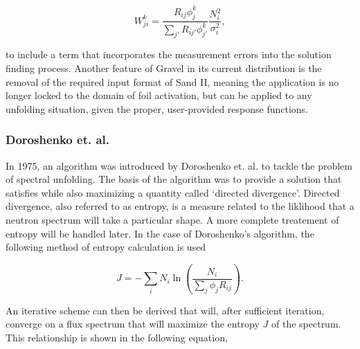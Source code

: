 \begin{equation}\label{eqn:gravel-w}
W_{ji}^k = \frac{R_{ij} \phi_{j}^k}{\sum_{j'} R_{ij'} \phi_{j'}^k} \frac{N_i^2}{\sigma_i^2} ,
\end{equation}

to include a term that incorporates the measurement errors into the solution finding process.
Another feature of Gravel in its current distribution is the removal of the required input format of Sand II, meaning the application is no longer locked to the domain of foil activation, but can be applied to any unfolding situation, given the proper, user-provided response functions.



\subsubsection{Doroshenko et. al.}

In 1975, an algorithm was introduced by Doroshenko et. al. to tackle the problem of spectral unfolding.
The basis of the algorithm was to provide a solution that satisfies  while also maximizing a quantity called `directed divergence'.
Directed divergence, also referred to as entropy, is a measure related to the liklihood that a neutron spectrum will take a particular shape.
A more complete treatement of entropy will be handled later.
In the case of Doroshenko's algorithm, the following method of entropy calculation is used

\begin{equation}\label{eqn:doroshenko-entropy}
J = - \sum_i N_i \ln(\frac{N_i}{\sum_j \phi_j R_{ij}}) .
\end{equation}

An iterative scheme can then be derived that will, after sufficient iteration, converge on a flux spectrum that will maximize the entropy $J$ of the spectrum.
This relationship is shown in the following equation,

